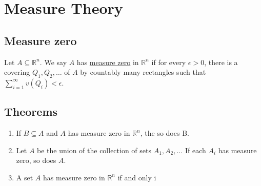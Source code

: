 \section{Measure Theory}

\subsection{Measure zero}
	Let $A\subseteq \mathbb{R}^n$. We say $A$ has \underline{measure zero}
	in $\mathbb{R}^n$ if for every $\epsilon>0$, there is a covering $Q_1, Q_2, \dots$ of $A$
	by countably many rectangles such that
	$\sum_{i=1}^\infty v(Q_i)<\epsilon$.



\subsection{Theorems}
\begin{enumerate}
  \item If $B \subseteq A$ and $A$ has measure zero in $\mathbb{R}^n$, the so does B.
  \item Let $A$ be the union of the collection of sets
        $A_1, A_2, \ldots$ If each $A_i$ has measure zero, so does $A$.
  \item A set $A$ has measure zero in $\mathbb{R}^n$ if and only i
\end{enumerate}